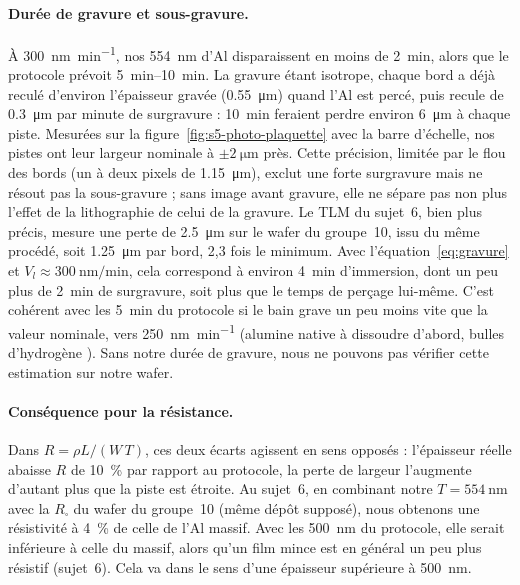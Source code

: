 \paragraph{Durée de gravure et sous-gravure.}
À \qty{300}{\nano\metre\per\minute}, nos \qty{554}{\nano\metre} d'Al disparaissent en moins de \qty{2}{\minute}, alors que le protocole prévoit \qtyrange{5}{10}{\minute}. La gravure étant isotrope, chaque bord a déjà reculé d'environ l'épaisseur gravée (\qty{0,55}{\micro\metre}) quand l'Al est percé, puis recule de \qty{0,3}{\micro\metre} par minute de surgravure : \qty{10}{\minute} feraient perdre environ \qty{6}{\micro\metre} à chaque piste. Mesurées sur la figure~\ref{fig:s5-photo-plaquette} avec la barre d'échelle, nos pistes ont leur largeur nominale à $\pm\qty{2}{\micro\metre}$ près. Cette précision, limitée par le flou des bords (un à deux pixels de \qty{1,15}{\micro\metre}), exclut une forte surgravure mais ne résout pas la sous-gravure ; sans image avant gravure, elle ne sépare pas non plus l'effet de la lithographie de celui de la gravure. Le TLM du sujet~6, bien plus précis, mesure une perte de \qty{2,5}{\micro\metre} sur le wafer du groupe~10, issu du même procédé, soit \qty{1,25}{\micro\metre} par bord, 2,3 fois le minimum. Avec l'équation~\eqref{eq:gravure} et $V_l \approx \qty{300}{\nano\metre\per\minute}$, cela correspond à environ \qty{4}{\minute} d'immersion, dont un peu plus de \qty{2}{\minute} de surgravure, soit plus que le temps de perçage lui-même. C'est cohérent avec les \qty{5}{\minute} du protocole si le bain grave un peu moins vite que la valeur nominale, vers \qty{250}{\nano\metre\per\minute} (alumine native à dissoudre d'abord, bulles d'hydrogène \cite{alumicro}). Sans notre durée de gravure, nous ne pouvons pas vérifier cette estimation sur notre wafer.

\paragraph{Conséquence pour la résistance.}
Dans $R = \rho L/(W\,T)$, ces deux écarts agissent en sens opposés : l'épaisseur réelle abaisse $R$ de \qty{10}{\percent} par rapport au protocole, la perte de largeur l'augmente d'autant plus que la piste est étroite. Au sujet~6, en combinant notre $T = \qty{554}{\nano\metre}$ avec la $R_\square$ du wafer du groupe~10 (même dépôt supposé), nous obtenons une résistivité à \qty{4}{\percent} de celle de l'Al massif. Avec les \qty{500}{\nano\metre} du protocole, elle serait inférieure à celle du massif, alors qu'un film mince est en général un peu plus résistif (sujet~6). Cela va dans le sens d'une épaisseur supérieure à \qty{500}{\nano\metre}.

